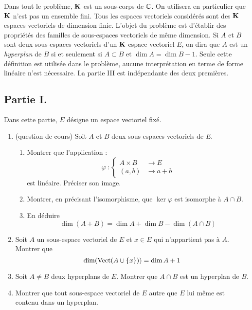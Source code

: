 Dans tout le problème, $\mathbf{K}$ est un sous-corps de $\mathbb{C}$. On utilisera en particulier que $\mathbf{K}$ n'est pas un ensemble fini.\newline
Tous les espaces vectoriels considérés sont des $\mathbf{K}$ espaces vectoriels de dimension finie.\newline
L'objet du problème est d'établir des propriétés des familles de sous-espaces vectoriels de même dimension.\newline
Si $A$ et $B$ sont deux sous-espaces vectoriels d'un $\mathbf{K}$-espace vectoriel $E$, on dira que $A$ est un \emph{hyperplan} de $B$ si et seulement si $A\subset B$ et $\dim A = \dim B -1$. Seule cette définition est utilisée dans le problème, aucune interprétation en terme de forme linéaire n'est nécessaire.\newline
La partie III  est indépendante des deux premières.
\subsection*{Partie I.}
Dans cette partie, $E$ désigne un espace vectoriel fixé. 
\begin{enumerate}
 \item (question de cours) Soit $A$ et $B$ deux sous-espaces vectoriels de $E$.
   \begin{enumerate}
      \item Montrer que l'application :
\begin{displaymath}
 \varphi \:: \left\lbrace
\begin{aligned}
 A\times B &\rightarrow E \\
 (a,b) &\rightarrow a+b
\end{aligned}
 \right. 
\end{displaymath}
 est linéaire. Préciser son image.
\item Montrer, en précisant l'isomorphisme, que $\ker \varphi$ est isomorphe à $A\cap B$.
\item En déduire
\begin{displaymath}
 \dim (A+B) = \dim A + \dim B - \dim (A\cap B)
\end{displaymath}
\end{enumerate}
\item Soit $A$ un sous-espace vectoriel de $E$ et $x\in E$ qui n'appartient pas à $A$. Montrer que
\begin{displaymath}
 \dim (\operatorname{Vect}(A\cup\{x\})) = \dim A +1
\end{displaymath}
\item Soit $A \neq B$ deux hyperplans de $E$. Montrer que $A\cap B$ est un hyperplan de $B$.
\item Montrer que tout sous-espace vectoriel de $E$ autre que $E$ lui même est contenu dans un hyperplan.
\end{enumerate}


